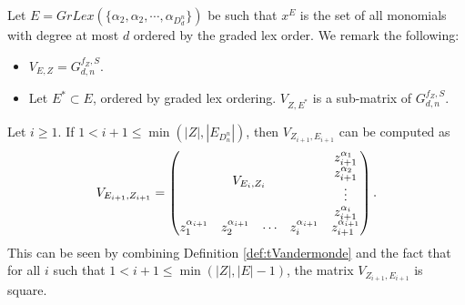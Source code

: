 \documentclass[11pt]{llncs}
\begin{document}
\begin{remark}\label{rem:subsetOfReedMuller}
Let $E = GrLex(\{\alpha_2, \alpha_2, \cdots, \alpha_{D_d^n}\})$ be such that $x^E$ is the set of all monomials with degree at most $d$ ordered by the graded lex order. 
    We remark the following:
    \begin{itemize}
        \item $V_{E,Z} = G_{d,n}^{f_{Z},S}$.
        \item Let $E^{*}\subset E$, ordered by graded lex ordering. $V_{Z,E^{*}}$ is a sub-matrix of $G_{d,n}^{f_Z, S}$.
    \end{itemize}
\end{remark}

\begin{remark}\label{rem:squareConstruction}
 Let $i\geq 1$. If $1< i+1 \leq \min{\left(|Z|, |E_{D_n^n}|\right)}$, then $V_{Z_{i+1}, E_{i+1}}$ can be computed as
    \begin{align*}
        V_{E_{i+1}, Z_{i+1}} = 
        \begin{pmatrix}
        \multicolumn{4}{c}{\multirow{4}{*}{$V_{E_{i}, Z_{i}}$}} & z_{i+1}^{\alpha_{1}}\\
        & & & & z_{i+1}^{\alpha_{2}}\\
        & & & & \vdots\\
        & & & & z_{i+1}^{\alpha_{i}}\\
        z_1^{\alpha_{i+1}} & z_2^{\alpha_{i+1}}& \cdots & z_{i}^{\alpha_{i+1}} & z_{i+1}^{\alpha_{i+1}}
    \end{pmatrix}.
    \end{align*}
    This can be seen by combining Definition \ref{def:tVandermonde} and the fact that for all $i$ such that $1< i+1 \leq \min{\left(|Z|, |E|-1\right)}$, the matrix $V_{Z_{i+1}, E_{i+1}}$ is square.
\end{remark}
\end{document}
